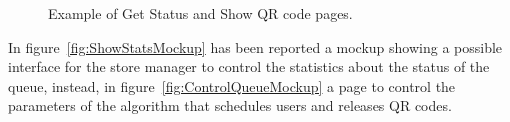 \begin{figure}[H]
	\centering     %
	\caption{Example of Get Status and Show QR code pages.}
\end{figure}

In figure~\ref{fig:ShowStatsMockup} has been reported a mockup showing a possible interface for the store manager to control the statistics about the status of the queue, instead,
in figure~\ref{fig:ControlQueueMockup} a page to control the parameters of the algorithm that schedules users and releases QR codes.


